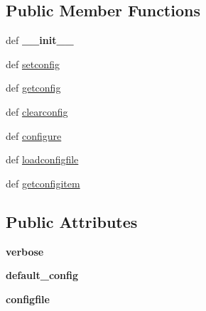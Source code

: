 \subsection*{Public Member Functions}
\begin{DoxyCompactItemize}
\item 
\hypertarget{classcore_1_1xen_1_1xenconfig_1_1_xen_config_manager_a0473baee450fef922137ad0cfc338fa3}{def {\bfseries \+\_\+\+\_\+init\+\_\+\+\_\+}}\label{classcore_1_1xen_1_1xenconfig_1_1_xen_config_manager_a0473baee450fef922137ad0cfc338fa3}

\item 
def \hyperlink{classcore_1_1xen_1_1xenconfig_1_1_xen_config_manager_a46ef1e19bf0385a95ccb1d9525b2245a}{setconfig}
\item 
def \hyperlink{classcore_1_1xen_1_1xenconfig_1_1_xen_config_manager_a6fe2717d47ddb4c1292e0d4ba9f8c168}{getconfig}
\item 
def \hyperlink{classcore_1_1xen_1_1xenconfig_1_1_xen_config_manager_ae4d8b056c0d497179523a962c556fa04}{clearconfig}
\item 
def \hyperlink{classcore_1_1xen_1_1xenconfig_1_1_xen_config_manager_a3a7cce4290b4c260e7599d471a7154c5}{configure}
\item 
def \hyperlink{classcore_1_1xen_1_1xenconfig_1_1_xen_config_manager_a115b272d129e3693b2ce26596a604065}{loadconfigfile}
\item 
def \hyperlink{classcore_1_1xen_1_1xenconfig_1_1_xen_config_manager_aff0ab925afcb50c244a0f20e736dd967}{getconfigitem}
\end{DoxyCompactItemize}
\subsection*{Public Attributes}
\begin{DoxyCompactItemize}
\item 
\hypertarget{classcore_1_1xen_1_1xenconfig_1_1_xen_config_manager_a93436adeccf59f3b1b4e1a267247bcf3}{{\bfseries verbose}}\label{classcore_1_1xen_1_1xenconfig_1_1_xen_config_manager_a93436adeccf59f3b1b4e1a267247bcf3}

\item 
\hypertarget{classcore_1_1xen_1_1xenconfig_1_1_xen_config_manager_ab85a31523cb44b759df43377a7d98db4}{{\bfseries default\+\_\+config}}\label{classcore_1_1xen_1_1xenconfig_1_1_xen_config_manager_ab85a31523cb44b759df43377a7d98db4}

\item 
\hypertarget{classcore_1_1xen_1_1xenconfig_1_1_xen_config_manager_a083b06e3dc3acd66478b7e6c0e0a1625}{{\bfseries configfile}}\label{classcore_1_1xen_1_1xenconfig_1_1_xen_config_manager_a083b06e3dc3acd66478b7e6c0e0a1625}

\end{DoxyCompactItemize}


